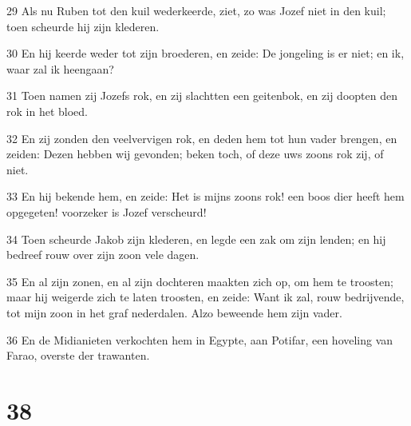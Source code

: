 \par 29 Als nu Ruben tot den kuil wederkeerde, ziet, zo was Jozef niet in den kuil; toen scheurde hij zijn klederen.
\par 30 En hij keerde weder tot zijn broederen, en zeide: De jongeling is er niet; en ik, waar zal ik heengaan?
\par 31 Toen namen zij Jozefs rok, en zij slachtten een geitenbok, en zij doopten den rok in het bloed.
\par 32 En zij zonden den veelvervigen rok, en deden hem tot hun vader brengen, en zeiden: Dezen hebben wij gevonden; beken toch, of deze uws zoons rok zij, of niet.
\par 33 En hij bekende hem, en zeide: Het is mijns zoons rok! een boos dier heeft hem opgegeten! voorzeker is Jozef verscheurd!
\par 34 Toen scheurde Jakob zijn klederen, en legde een zak om zijn lenden; en hij bedreef rouw over zijn zoon vele dagen.
\par 35 En al zijn zonen, en al zijn dochteren maakten zich op, om hem te troosten; maar hij weigerde zich te laten troosten, en zeide: Want ik zal, rouw bedrijvende, tot mijn zoon in het graf nederdalen. Alzo beweende hem zijn vader.
\par 36 En de Midianieten verkochten hem in Egypte, aan Potifar, een hoveling van Farao, overste der trawanten.

\chapter{38}

